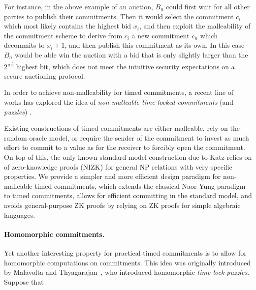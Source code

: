 For instance, in the above example of an auction, $B_n$ could first wait for all other parties to publish their commitments. Then it would select the commitment $c_i$ which most likely contains the highest bid $x_i$, and then exploit the malleability of the commitment scheme to derive from $c_i$ a new commitment $c_n$ which decommits to $x_i + 1$, and then publish this commitment as its own. In this case $B_n$ would be able win the auction with a bid that is only slightly larger than the 2\textsuperscript{nd} highest bit, which does not meet the intuitive security expectations on a secure auctioning protocol.

In order to achieve non-malleability for timed commitments, a recent line of works has explored the idea of \emph{non-malleable time-locked commitments} (and \emph{puzzles})  \cite{TCC:KatLosXu20,EPRINT:EFKP20a,EC:BDDNO21}.


Existing constructions of timed commitments are either malleable, rely on the random oracle model, or require the sender of the commitment to invest as much effort to commit to a value as for the receiver to forcibly open the commitment.  On top of this, the only known standard model construction due to Katz \etal \cite{TCC:KatLosXu20} relies on of zero-knowledge proofs (NIZK) for general NP relations with very specific properties. 
We provide a simpler and more efficient design paradigm for non-malleable timed commitments, which extends the classical Naor-Yung paradigm \cite{STOC:NaoYun90} to timed commitments, allows for efficient committing in the standard model, and avoids general-purpose ZK proofs by relying on ZK proofs for simple algebraic languages.


\paragraph{Homomorphic commitments.}
Yet another interesting property for practical timed commitments is to allow for homomorphic computations on commitments. This idea was originally introduced by Malavolta and Thyagarajan~\cite{C:MalThy19}, who introduced homomorphic \emph{time-lock puzzles}. Suppose that


